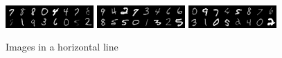 \documentclass{article}
\begin{document}
	\begin{figure}[H]
		\centering
		\includegraphics[width=0.3\textwidth]{images/original_0.0} \hfill
		\includegraphics[width=0.3\textwidth]{images/original_0.5} \hfill
		\includegraphics[width=0.3\textwidth]{images/original_1.0}
		\caption{Images in a horizontal line}
		\label{fig:original_images}
	\end{figure}
	
\end{document}
